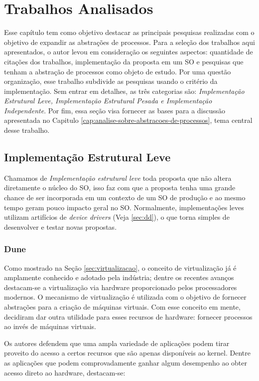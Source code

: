 \chapter{Trabalhos Analisados}
\label{cap:trabalhos-analisados}

Esse capítulo tem como objetivo destacar as principais pesquisas realizadas com
o objetivo de expandir as abstrações de processos. Para a seleção dos trabalhos
aqui apresentados, o autor levou em consideração os seguintes aspectos:
quantidade de citações dos trabalhos, implementação da proposta em um SO e
pesquisas que tenham a abstração de processos como objeto de estudo. Por uma
questão organização, esse trabalho subdivide as pesquisas usando o critério da
implementação. Sem entrar em detalhes, as três categorias são:
\textit{Implementação Estrutural Leve, Implementação Estrutural Pesada e
Implementação Independente}. Por fim, essa seção visa fornecer as bases para a
discussão apresentada no Capitulo
\ref{cap:analise-sobre-abstracoes-de-processos}, tema central desse trabalho.

\section{Implementação Estrutural Leve}

Chamamos de \textit{Implementação estrutural leve} toda proposta que não altera
diretamente o núcleo do SO, isso faz com que a proposta tenha uma grande chance
de ser incorporada em um contexto de um SO de produção e ao mesmo tempo geram
pouco impacto geral no SO. Normalmente, implementações leves utilizam
artifícios de \emph{device drivers} (Veja \ref{sec:dd}), o que torna simples de
desenvolver e testar novas propostas.

\subsection{Dune}

Como mostrado na Seção \ref{sec:virtualizacao}, o conceito de virtualização já
é amplamente conhecido e adotado pela indústria; dentre os recentes avanços
destacam-se a virtualização via hardware proporcionado pelos processadores
modernos. O mecanismo de virtualização é utilizada com o objetivo de fornecer
abstrações para a criação de máquinas virtuais. Com esse conceito em mente,
\cite{belay} decidiram dar outra utilidade para esses recursos de hardware:
fornecer processos ao invés de máquinas virtuais.

Os autores defendem que uma ampla variedade de aplicações podem tirar proveito
do acesso a certos recursos que são apenas disponíveis ao kernel. Dentre as
aplicações que podem comprovadamente ganhar algum desempenho ao obter acesso
direto ao hardware, destacam-se:

